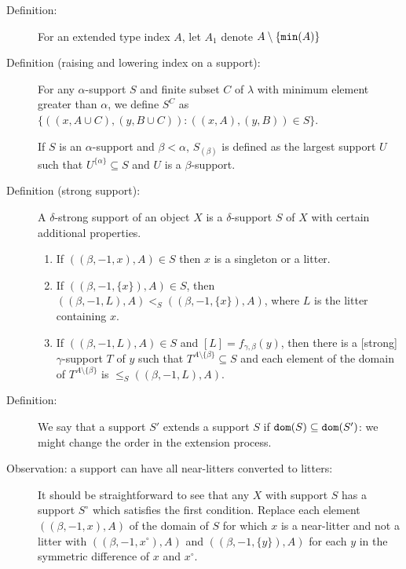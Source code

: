 \documentclass[112pt]{article}
\begin{document}
\begin{description}

\item[Definition:]  For an extended type index $A$, let $A_1$ denote $A \setminus \{{\tt min}(A)\}$

\item[Definition (raising and lowering index on a support):]  For any $\alpha$-support $S$ and finite subset $C$ of $\lambda$ with minimum element greater than $\alpha$, we define $S^C$ as
$\{((x,A\cup C),(y,B\cup C)):((x,A),(y,B)) \in S\}$.

If $S$ is an $\alpha$-support and $\beta<\alpha$, $S_{(\beta)}$ is defined as the largest support $U$ such that $U^{\{\alpha\}} \subseteq S$ and $U$ is a $\beta$-support.

\item[Definition (strong support):]  A $\delta$-strong support of an object $X$ is a $\delta$-support $S$ of $X$ with certain additional properties.

\begin{enumerate}

\item  If $((\beta,-1,x),A) \in S$ then $x$ is a singleton or a litter.

\item  If $((\beta,-1,\{x\}),A) \in S$, then $((\beta,-1,L),A) <_S ((\beta,-1,\{x\}),A)$, where $L$ is the litter containing $x$.

\item  If $((\beta,-1,L),A) \in S$ and $[L]=f_{\gamma,\beta}(y)$, then there is a [strong] $\gamma$-support $T$ of $y$ such that $T^{A \setminus \{\beta\}} \subseteq S$ and each element of the domain of $T^{A \setminus \{\beta\}}$ is $\leq_S ((\beta,-1,L),A)$.

\end{enumerate}

\item[Definition:]  We say that a support $S'$ extends a support $S$ if ${\tt dom}(S) \subseteq {\tt dom}(S')$:  we might change the order in the extension process.

\item[Observation:  a support can have all near-litters converted to litters:]  It should be straightforward to see that any $X$ with support $S$ has a support $S^\circ$ which satisfies the first condition.  Replace each
element $((\beta,-1,x),A)$ of the domain of $S$ for which $x$ is a near-litter and not a litter with $((\beta,-1,x^\circ),A)$ and $((\beta,-1,\{y\}),A)$ for each $y$ in the symmetric difference of $x$ and $x^\circ$.


\end{description}
\end{document}
